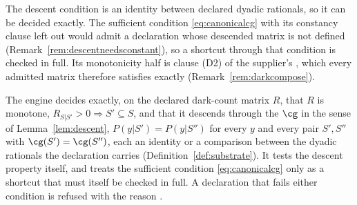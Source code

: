 
The descent condition is an identity between declared dyadic rationals, so
it can be decided exactly. The sufficient condition \eqref{eq:canonicalcg}
with its constancy clause left out would admit a declaration whose descended
matrix is not defined (Remark~\ref{rem:descentneedsconstant}), so a shortcut
through that condition is checked in full. Its monotonicity half is clause
(D2) of the supplier's , which every admitted matrix
therefore satisfies exactly (Remark~\ref{rem:darkcompose}).

\begin{requirement}\label{req:descent-decided-exactly}
The engine decides exactly, on the declared dark-count matrix $R$, that $R$
is monotone, $R_{S|S'}>0\Rightarrow S'\subseteq S$, and that it descends
through the  $\cg$ in the sense of
Lemma~\ref{lem:descent}, $P(y|S')=P(y|S'')$ for every $y$ and every pair
$S',S''$ with $\cg(S')=\cg(S'')$, each an identity or a comparison between the
dyadic rationals the declaration carries (Definition~\ref{def:substrate}). It
tests the descent property itself, and treats the sufficient condition
\eqref{eq:canonicalcg} only as a shortcut that must itself be checked in
full. A declaration that fails either condition is refused with the reason
.
\end{requirement}
